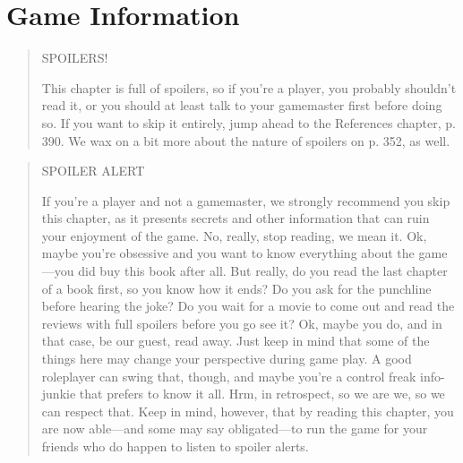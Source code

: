 



\chapter{Game Information} \label{cha:game-information} 















\begin{quotation} \begin{LARGE} \begin{center} SPOILERS! \end{center} \end{LARGE} This chapter is full of spoilers, so if you’re a player, you probably shouldn’t read it, or you should at least talk to your gamemaster first before doing so. If you want to skip it entirely, jump ahead to the References chapter, p. 390. We wax on a bit more about the nature of spoilers on p. 352, as well. \end{quotation} 

\pagebreak













\begin{quotation} \begin{LARGE} SPOILER ALERT \end{LARGE} 

If you’re a player and not a gamemaster, we strongly recommend you skip this chapter, as it presents secrets and other information that can ruin your enjoyment of the game. No, really, stop reading, we mean it. Ok, maybe you’re obsessive and you want to know everything about the game—you did buy this book after all. But really, do you read the last chapter of a book first, so you know how it ends? Do you ask for the punchline before hearing the joke? Do you wait for a movie to come out and read the reviews with full spoilers before you go see it? Ok, maybe you do, and in that case, be our guest, read away. Just keep in mind that some of the things here may change your perspective during game play. A good roleplayer can swing that, though, and maybe you’re a control freak info-junkie that prefers to know it all. Hrm, in retrospect, so we are we, so we can respect that. Keep in mind, however, that by reading this chapter, you are now able—and some may say obligated—to run the game for your friends who do happen to listen to spoiler alerts. \end{quotation} 



